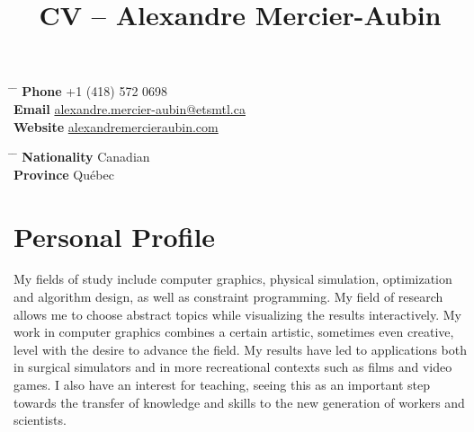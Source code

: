\documentclass[10pt]{article} %
\begin{document}

\title{CV -- Alexandre Mercier-Aubin} %


\parbox{0.5\textwidth}{ %
\begin{tabbing} %
\hspace{3cm} \= \hspace{4cm} \= \kill %
{\bf Phone} \> +1 (418) 572 0698 \\ %
{\bf Email} \> \href{mailto:alexandre.mercier-aubin@etsmtl.ca}{alexandre.mercier-aubin@etsmtl.ca} \\ %
{\bf Website} \> \href{https://alexandremercieraubin.com}{alexandremercieraubin.com} \\
\end{tabbing}}
\hfill %
\parbox{0.5\textwidth}{ %
\begin{tabbing} %
\hspace{3cm} \= \hspace{4cm} \= \kill %
{\bf Nationality} \> Canadian \\ %
{\bf Province} \> {Québec}\\
\end{tabbing}}

\vspace{-0.7cm} 

\justifying


\section{Personal Profile}

My fields of study include computer graphics, physical simulation, optimization and algorithm design, as well as constraint programming. My field of research allows me to choose abstract topics while visualizing the results interactively. My work in computer graphics combines a certain artistic, sometimes even creative, level with the desire to advance the field. My results have led to applications both in surgical simulators and in more recreational contexts such as films and video games. I also have an interest for teaching, seeing this as an important step towards the  transfer of knowledge and skills to the new generation of workers and scientists.
\end{document}
